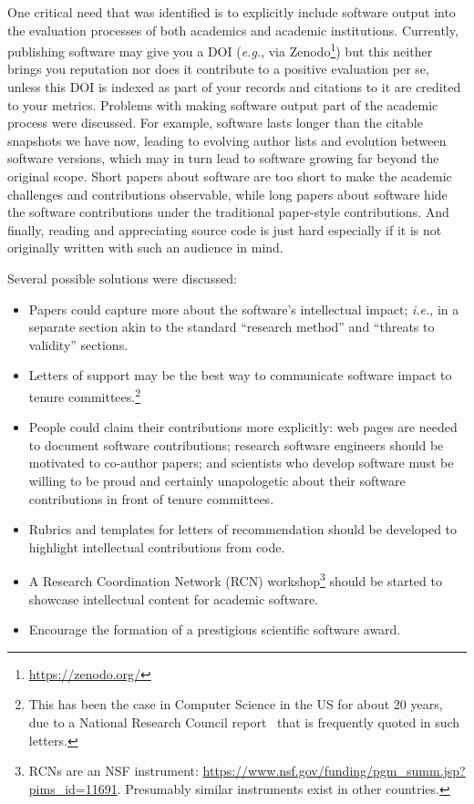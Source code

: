\documentclass[a4paper,UKenglish]{dagrep}
\newcommand{\ie}{\emph{i.e.},\xspace}
\newcommand{\eg}{\emph{e.g.},\xspace}
\begin{document}
One critical need that was identified is to explicitly include software output into the evaluation processes of both academics and academic institutions. Currently, publishing software may give you a DOI (\eg via Zenodo\footnote{\url{https://zenodo.org/}}) but this neither brings you reputation nor does it contribute to a positive evaluation per se, unless this DOI is indexed as part of your records and citations to it are credited to your metrics.
Problems with making software output part of the academic process were discussed. For example, software lasts longer than the citable snapshots we have now, leading to evolving author lists and evolution between software versions, which may in turn lead to software growing far beyond the original scope. Short papers about software are too short to make the academic challenges and contributions observable, while long papers about software hide the software contributions under the traditional paper-style contributions. And finally, reading and appreciating source code is just hard especially if it is not originally written with such an audience in mind.

Several possible solutions were discussed: %
\begin{itemize}
	\item Papers could capture more about the software's intellectual impact; \ie in a separate section akin to the standard ``research method'' and ``threats to validity'' sections.
    \item Letters of support may be the best way to communicate software impact to tenure committees.\footnote{This has been the case in Computer Science in the US for about 20 years, due to a National Research Council report~\cite{NRC-CS-1994} that is frequently quoted in such letters.}
    \item People could claim their contributions more explicitly:
    	web pages are needed to document software contributions;
		research software engineers should be motivated to co-author papers;
		and scientists who develop software must be willing to be proud and certainly unapologetic about their software contributions in front of tenure committees.
    \item Rubrics and templates for letters of recommendation should be developed to highlight intellectual contributions from code.
    \item A Research Coordination Network (RCN) workshop\footnote{RCNs are an NSF instrument: \url{https://www.nsf.gov/funding/pgm_summ.jsp?pims_id=11691}. Presumably similar instruments exist in other countries.} should be started to showcase intellectual content for academic software.
    \item Encourage the formation of a prestigious scientific software award.
\end{itemize}
\end{document}
